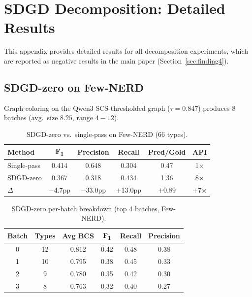 \documentclass[11pt,a4paper]{article}
\newcommand{\fone}{F\textsubscript{1}}
\begin{document}
\appendix
\section{SDGD Decomposition: Detailed Results}
\label{app:sdgd}

This appendix provides detailed results for all decomposition experiments, which are reported as negative results in the main paper (Section~\ref{sec:finding4}).

\subsection{SDGD-zero on Few-NERD}
\label{app:sdgd_zero_fewnerd}

Graph coloring on the Qwen3 SCS-thresholded graph ($\tau{=}0.847$) produces 8 batches (avg.\ size $8.25$, range $4{-}12$).

\begin{table}[h]
\centering
\caption{SDGD-zero vs.\ single-pass on Few-NERD (66 types).}
\label{tab:sdgd_zero_fewnerd}
\small
\begin{tabular}{lccccc}
\toprule
\textbf{Method} & \textbf{\fone{}} & \textbf{Precision} & \textbf{Recall} & \textbf{Pred/Gold} & \textbf{API} \\
\midrule
Single-pass & 0.414 & 0.648 & 0.304 & 0.47 & 1$\times$ \\
SDGD-zero   & 0.367 & 0.318 & 0.434 & 1.36 & 8$\times$ \\
$\Delta$    & $-$4.7pp & $-$33.0pp & $+$13.0pp & $+$0.89 & $+$7$\times$ \\
\bottomrule
\end{tabular}
\end{table}

\begin{table}[h]
\centering
\caption{SDGD-zero per-batch breakdown (top 4 batches, Few-NERD).}
\label{tab:sdgd_zero_perbatch}
\small
\begin{tabular}{cccccc}
\toprule
\textbf{Batch} & \textbf{Types} & \textbf{Avg BCS} & \textbf{\fone{}} & \textbf{Recall} & \textbf{Precision} \\
\midrule
0 & 12 & 0.812 & 0.42 & 0.48 & 0.38 \\
1 & 10 & 0.795 & 0.38 & 0.45 & 0.33 \\
2 & 9  & 0.780 & 0.35 & 0.42 & 0.30 \\
3 & 8  & 0.763 & 0.32 & 0.40 & 0.27 \\
\bottomrule
\end{tabular}
\end{table}
\end{document}
